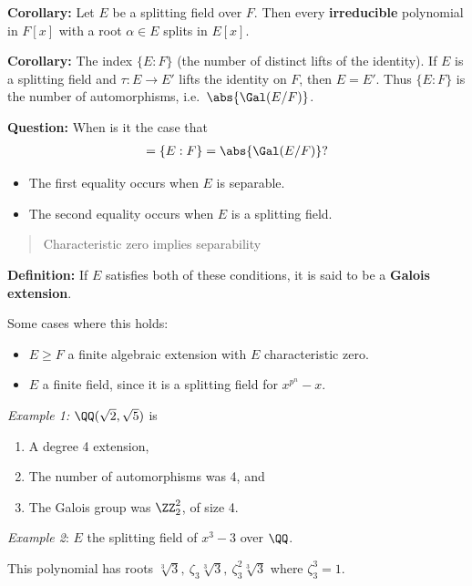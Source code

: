 \textbf{Corollary:} Let \(E\) be a splitting field over \(F\). Then
every \textbf{irreducible} polynomial in \(F[x]\) with a root
\(\alpha \in E\) splits in \(E[x]\).

\textbf{Corollary:} The index \(\{ E: F \}\) (the number of distinct
lifts of the identity). If \(E\) is a splitting field and
\(\tau:E \to E'\) lifts the identity on \(F\), then \(E = E'\). Thus
\(\{ E : F \}\) is the number of automorphisms,
i.e.~\(\abs{\Gal(E/F)}\).

\textbf{Question:} When is it the case that
\begin{align*}
[E: F] = \{E: F\} = \abs{\Gal(E/F)}?
\end{align*}

\begin{itemize}
\item
  The first equality occurs when \(E\) is separable.
\item
  The second equality occurs when \(E\) is a splitting field.
\end{itemize}

\begin{quote}
Characteristic zero implies separability
\end{quote}

\textbf{Definition:} If \(E\) satisfies both of these conditions, it is
said to be a \textbf{Galois extension}.

Some cases where this holds:

\begin{itemize}
\item
  \(E \geq F\) a finite algebraic extension with \(E\) characteristic
  zero.
\item
  \(E\) a finite field, since it is a splitting field for
  \(x^{p^n} - x\).
\end{itemize}

\emph{Example 1:} \(\QQ(\sqrt 2, \sqrt 5)\) is

\begin{enumerate}
\def\labelenumi{\arabic{enumi}.}
\item
  A degree 4 extension,
\item
  The number of automorphisms was 4, and
\item
  The Galois group was \(\ZZ_2^2\), of size 4.
\end{enumerate}

\emph{Example 2}: \(E\) the splitting field of \(x^3 - 3\) over \(\QQ\).

This polynomial has roots
\(\sqrt[3] 3,~ \zeta_3 \sqrt[3] 3,~ \zeta_3^2 \sqrt[3] 3\) where
\(\zeta_3^3 = 1\).

